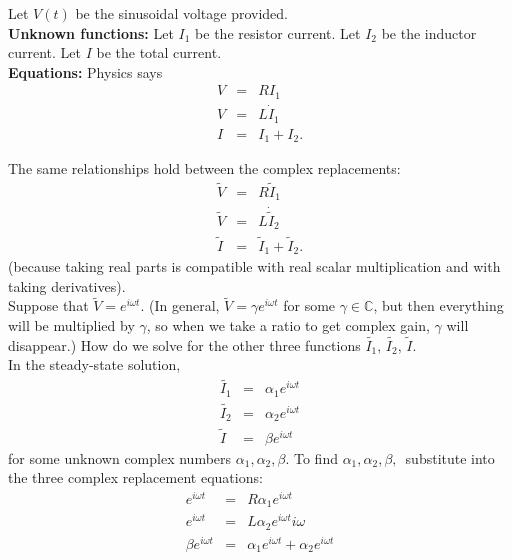 Let $V(t)$ be the sinusoidal voltage provided. \\

\textbf{\color{blue} Unknown functions:}
Let $I _1$ be the resistor current. Let $I _2$ be the inductor current. Let $I$ be the total current. \\
\textbf{\color{blue} Equations:} Physics says
\begin{eqnarray*}
  V &=& R I _1 \\
  V &=& L \dot I _1 \\
  I &=&  I _1 + I _2. 
\end{eqnarray*}

The same relationships hold between the complex replacements:
\begin{eqnarray*}
  \widetilde{V} &=& R \widetilde{I} _1 \\
  \widetilde{V} &=& L \dot{\widetilde{I}}_2 \\
  \widetilde{I} &=&  \widetilde{I} _1 + \widetilde{I} _2. 
\end{eqnarray*}
(because taking real parts is compatible with real scalar multiplication
and with taking derivatives).\\

Suppose that $\widetilde{V} = e^{i \omega t}$.
(In general, $\widetilde{V} = \gamma e^{i \omega t}$ for some $\gamma \in \mathbb {C}$,
but then everything will be multiplied by $\gamma$, so when we take a ratio to get complex gain,
$\gamma$ will disappear.) How do we solve for the other three functions
$\widetilde{I_1},\, \widetilde{I_2},\, \widetilde{I}$. \\
In the steady-state solution,
\begin{eqnarray*}
  \widetilde{I_1}  &=& \alpha _1 e^{i \omega t} \\
  \widetilde{I_2}  &=& \alpha _2 e^{i \omega t} \\
  \widetilde{I} &=&  \beta e^{i \omega t}
\end{eqnarray*}
for some unknown complex numbers $\alpha _1,\alpha _2,\beta$.
To find $\alpha _1,\alpha _2,\beta,\,$ substitute into the three complex replacement equations:
\begin{eqnarray*}
  e^{i\omega t}  &=& R \alpha _1 e^{i \omega t} \\
  e^{i\omega t}  &=& L \alpha _2 e^{i \omega t} i \omega \\
  \beta e^{i\omega t}  &=&  \alpha _1 e^{i \omega t} + \alpha _2 e^{i \omega t}
\end{eqnarray*}

